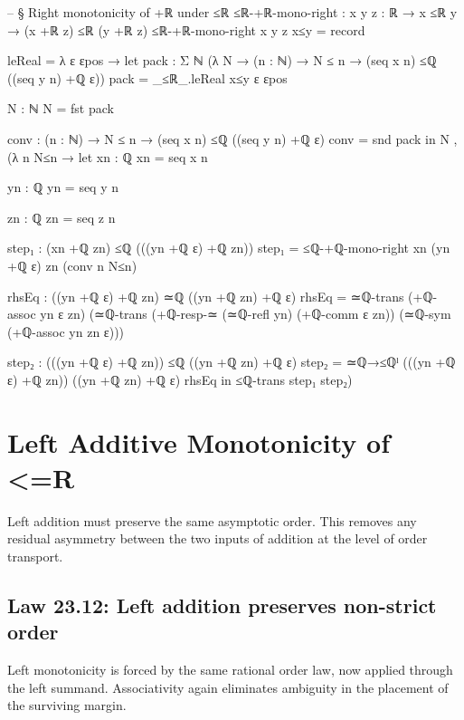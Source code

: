 \documentclass[11pt,a4paper]{book}
\def\mathbb#1{#1}%
\def\texorpdfstring#1#2{#2}%
\begin{document}
\begin{code}
-- § Right monotonicity of +ℝ under ≤ℝ
≤ℝ-+ℝ-mono-right : {x y z : ℝ} → x ≤ℝ y → (x +ℝ z) ≤ℝ (y +ℝ z)
≤ℝ-+ℝ-mono-right {x} {y} {z} x≤y = record
  { leReal = λ ε εpos →
      let
        pack : Σ ℕ (λ N → (n : ℕ) → N ≤ n → (seq x n) ≤ℚ ((seq y n) +ℚ ε))
        pack = _≤ℝ_.leReal x≤y ε εpos

        N : ℕ
        N = fst pack

        conv : (n : ℕ) → N ≤ n → (seq x n) ≤ℚ ((seq y n) +ℚ ε)
        conv = snd pack
      in
      N , (λ n N≤n →
        let
          xn : ℚ
          xn = seq x n

          yn : ℚ
          yn = seq y n

          zn : ℚ
          zn = seq z n

          step₁ : (xn +ℚ zn) ≤ℚ (((yn +ℚ ε) +ℚ zn))
          step₁ = ≤ℚ-+ℚ-mono-right xn (yn +ℚ ε) zn (conv n N≤n)

          rhsEq : ((yn +ℚ ε) +ℚ zn) ≃ℚ ((yn +ℚ zn) +ℚ ε)
          rhsEq =
            ≃ℚ-trans
              (+ℚ-assoc yn ε zn)
              (≃ℚ-trans
                (+ℚ-resp-≃ (≃ℚ-refl yn) (+ℚ-comm ε zn))
                (≃ℚ-sym (+ℚ-assoc yn zn ε)))

          step₂ : (((yn +ℚ ε) +ℚ zn)) ≤ℚ ((yn +ℚ zn) +ℚ ε)
          step₂ = ≃ℚ→≤ℚˡ {(((yn +ℚ ε) +ℚ zn))} {((yn +ℚ zn) +ℚ ε)} rhsEq
        in
        ≤ℚ-trans step₁ step₂)
  }
\end{code}


\section{Left Additive Monotonicity of \texorpdfstring{$\le_{\mathbb{R}}$}{<=R}}

Left addition must preserve the same asymptotic order. This removes any residual asymmetry between the two inputs of addition at the level of order transport.

\subsection*{Law 23.12: Left addition preserves non-strict order}

Left monotonicity is forced by the same rational order law, now applied through the left summand. Associativity again eliminates ambiguity in the placement of the surviving margin.
\end{document}
